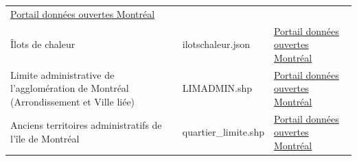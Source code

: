 \documentclass[]{book}
\theoremstyle{definition}
\theoremstyle{definition}
\theoremstyle{definition}
\theoremstyle{remark}
\begin{document}
\begin{longtable}[]{@{}lll@{}}
\begin{minipage}[t]{0.10\columnwidth}
\href{http://donnees.ville.montreal.qc.ca/dataset/grands-parcs}{Portail
données ouvertes Montréal}\strut
\end{minipage}\tabularnewline
\begin{minipage}[t]{0.08\columnwidth}\raggedright\strut
Îlots de chaleur\strut
\end{minipage} & \begin{minipage}[t]{0.16\columnwidth}\raggedright\strut
ilotschaleur.json\strut
\end{minipage} & \begin{minipage}[t]{0.10\columnwidth}\raggedright\strut
\href{http://donnees.ville.montreal.qc.ca/dataset/schema-environnement-milieux-naturels/resource/8cd8d34a-cfdd-4acf-a363-d4adaeff18c0}{Portail
données ouvertes Montréal}\strut
\end{minipage}\tabularnewline
\begin{minipage}[t]{0.08\columnwidth}\raggedright\strut
Limite administrative de l'agglomération de Montréal (Arrondissement et
Ville liée)\strut
\end{minipage} & \begin{minipage}[t]{0.16\columnwidth}\raggedright\strut
LIMADMIN.shp\strut
\end{minipage} & \begin{minipage}[t]{0.10\columnwidth}\raggedright\strut
\href{http://donnees.ville.montreal.qc.ca/dataset/polygones-arrondissements}{Portail
données ouvertes Montréal}\strut
\end{minipage}\tabularnewline
\begin{minipage}[t]{0.08\columnwidth}\raggedright\strut
Anciens territoires administratifs de l'île de Montréal\strut
\end{minipage} & \begin{minipage}[t]{0.16\columnwidth}\raggedright\strut
quartier\_limite.shp\strut
\end{minipage} & \begin{minipage}[t]{0.10\columnwidth}\raggedright\strut
\href{http://donnees.ville.montreal.qc.ca/dataset/anciens-territoires}{Portail
données ouvertes Montréal}\strut
\end{minipage}\tabularnewline
\bottomrule
\end{longtable}


\end{document}

